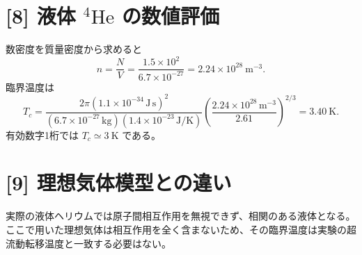 \documentclass[11pt,a4paper]{article}
\begin{document}
\section*{[8] 液体 $^4\mathrm{He}$ の数値評価}
数密度を質量密度から求めると
\begin{equation}
 n=\frac{N}{V}=\frac{1.5\times10^2}{6.7\times10^{-27}}
   =2.24\times10^{28}\ \mathrm{m^{-3}}.
\end{equation}
臨界温度は
\begin{equation}
 T_c=\frac{2\pi(1.1\times10^{-34}\,\mathrm{J\,s})^2}
 { (6.7\times10^{-27}\,\mathrm{kg})(1.4\times10^{-23}\,\mathrm{J/K})}
 \left(\frac{2.24\times10^{28}\,\mathrm{m^{-3}}}{2.61}\right)^{2/3}
 =3.40\ \mathrm K.
\end{equation}
有効数字1桁では $\boxed{T_c\simeq3\ \mathrm K}$ である。

\section*{[9] 理想気体模型との違い}
実際の液体ヘリウムでは原子間相互作用を無視できず、相関のある液体となる。ここで用いた理想気体は相互作用を全く含まないため、その臨界温度は実験の超流動転移温度と一致する必要はない。
\end{document}
